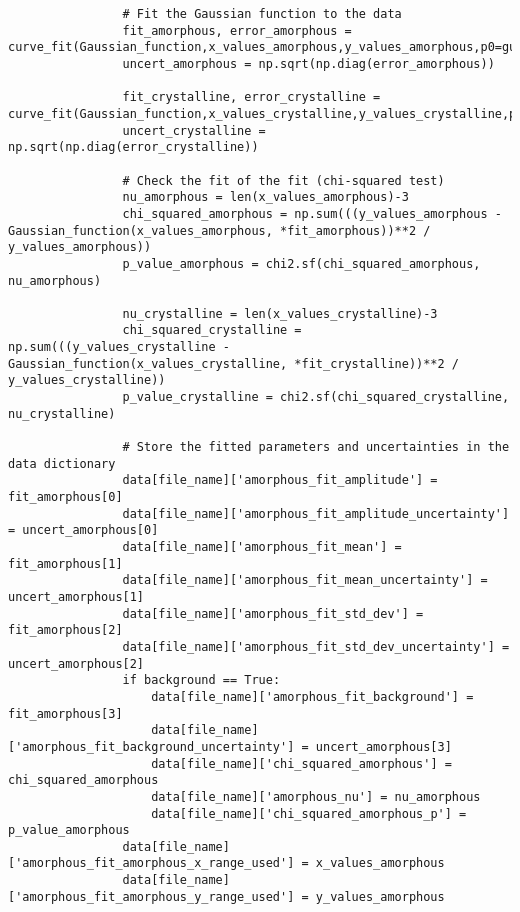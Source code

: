 \begin{lstlisting}
                # Fit the Gaussian function to the data
                fit_amorphous, error_amorphous = curve_fit(Gaussian_function,x_values_amorphous,y_values_amorphous,p0=guess_amorphous)
                uncert_amorphous = np.sqrt(np.diag(error_amorphous))

                fit_crystalline, error_crystalline = curve_fit(Gaussian_function,x_values_crystalline,y_values_crystalline,p0=guess_crystalline)
                uncert_crystalline = np.sqrt(np.diag(error_crystalline))

                # Check the fit of the fit (chi-squared test)
                nu_amorphous = len(x_values_amorphous)-3
                chi_squared_amorphous = np.sum(((y_values_amorphous - Gaussian_function(x_values_amorphous, *fit_amorphous))**2 / y_values_amorphous))
                p_value_amorphous = chi2.sf(chi_squared_amorphous, nu_amorphous)

                nu_crystalline = len(x_values_crystalline)-3
                chi_squared_crystalline = np.sum(((y_values_crystalline - Gaussian_function(x_values_crystalline, *fit_crystalline))**2 / y_values_crystalline))
                p_value_crystalline = chi2.sf(chi_squared_crystalline, nu_crystalline)

                # Store the fitted parameters and uncertainties in the data dictionary
                data[file_name]['amorphous_fit_amplitude'] = fit_amorphous[0]
                data[file_name]['amorphous_fit_amplitude_uncertainty'] = uncert_amorphous[0]
                data[file_name]['amorphous_fit_mean'] = fit_amorphous[1]
                data[file_name]['amorphous_fit_mean_uncertainty'] = uncert_amorphous[1]
                data[file_name]['amorphous_fit_std_dev'] = fit_amorphous[2]
                data[file_name]['amorphous_fit_std_dev_uncertainty'] = uncert_amorphous[2]
                if background == True:
                    data[file_name]['amorphous_fit_background'] = fit_amorphous[3]
                    data[file_name]['amorphous_fit_background_uncertainty'] = uncert_amorphous[3]
                    data[file_name]['chi_squared_amorphous'] = chi_squared_amorphous
                    data[file_name]['amorphous_nu'] = nu_amorphous
                    data[file_name]['chi_squared_amorphous_p'] = p_value_amorphous
                data[file_name]['amorphous_fit_amorphous_x_range_used'] = x_values_amorphous
                data[file_name]['amorphous_fit_amorphous_y_range_used'] = y_values_amorphous


\end{lstlisting}
